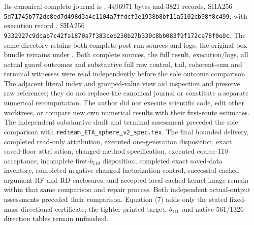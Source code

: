 \documentclass[10pt]{article}
\begin{document}
Its canonical complete journal is
,
4496971 bytes and 3821 records, SHA256
\texttt{5d71745b772dc8ed7d498d3a4c1104a7ffdcf3e1938b8bf11a5102cb98f8c499},
with execution record
,
SHA256
\texttt{9332927c9dcab7c42fa1870a7f383ceb230b27b339c8bb083f9f172ce78f0e0c}.
The same directory retains both complete post-run sources
and logs; the original box bundle remains under
.
Both complete sources, the full result, execution/logs,
all actual guard outcomes and substantive full raw control,
tail, coherent-sum and terminal witnesses were read independently
before the sole outcome comparison. The adjacent literal
index and grouped-value view aid inspection and preserve raw
references; they do not replace the canonical journal or
constitute a separate numerical recomputation.
The author did not execute scientific code, edit other worktrees,
or compare new own numerical results with their first-route
estimates. The independent substantive draft and terminal assessment
preceded the sole comparison with
\texttt{redteam\_ETA\_sphere\_v2\_spec.tex}. The final bounded
delivery, completed read-only attribution, executed one-generation
disposition, exact saved-floor attribution, changed-method
specification, executed coarse-$110$ acceptance, incomplete
first-$b_{110}$ disposition, completed exact saved-data
inventory, completed negative changed-factorization
control, successful cached-argument RF and RD enclosures,
and accepted local cached-kernel image remain within
that same comparison and repair process. Both independent
actual-output assessments preceded their comparison. Equation (7)
adds only the stated fixed-mass directional certificate; the
tighter printed target, $b_{110}$ and native 561/1326-direction
tables remain unfinished.
\end{document}
